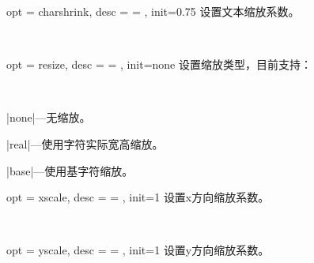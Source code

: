 \documentclass[full]{l3doc}
\begin{document}
\begin{documentation}
\bigskip

\begin{option}{ opt = charshrink, desc = {= }, init=0.75 }
  设置文本缩放系数。
\end{option}\\
\begin{SideBySideExample}[frame=single,numbers=left,xrightmargin=.45\linewidth,gobble=2]
  \centering
  \quad
  \quad
  \quad
\end{SideBySideExample}

\bigskip

\begin{option}{ opt = resize, desc = {= }, init=none }
  设置缩放类型，目前支持：
\end{option}\\
\begin{Description}
  \item |none|---无缩放。
  \item |real|---使用字符实际宽高缩放。
  \item |base|---使用基字符缩放。
\end{Description}
\begin{SideBySideExample}[frame=single,numbers=left,xrightmargin=.45\linewidth,gobble=2]
  \centering
  \quad
  \quad
\end{SideBySideExample}

\bigskip

\begin{option}{ opt = xscale, desc = {= }, init=1 }
  设置x方向缩放系数。
\end{option}\\
\begin{SideBySideExample}[frame=single,numbers=left,xrightmargin=.45\linewidth,gobble=2]
  \centering
  \quad
  \quad
\end{SideBySideExample}

\bigskip

\begin{option}{ opt = yscale, desc = {= }, init=1 }
  设置y方向缩放系数。
\end{option}\\
\begin{SideBySideExample}[frame=single,numbers=left,xrightmargin=.45\linewidth,gobble=2]
  \centering
  \quad
  \quad
\end{SideBySideExample}


\end{documentation}
\end{document}
